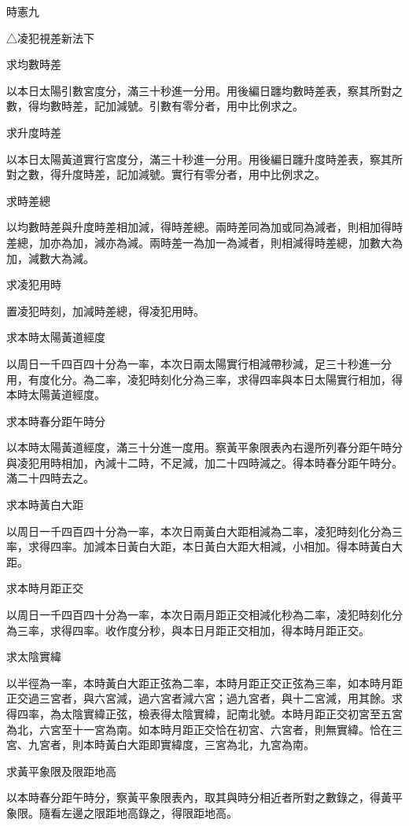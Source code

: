 
\begin{pinyinscope}
時憲九

△凌犯視差新法下

求均數時差

以本日太陽引數宮度分，滿三十秒進一分用。用後編日躔均數時差表，察其所對之數，得均數時差，記加減號。引數有零分者，用中比例求之。

求升度時差

以本日太陽黃道實行宮度分，滿三十秒進一分用。用後編日躔升度時差表，察其所對之數，得升度時差，記加減號。實行有零分者，用中比例求之。

求時差總

以均數時差與升度時差相加減，得時差總。兩時差同為加或同為減者，則相加得時差總，加亦為加，減亦為減。兩時差一為加一為減者，則相減得時差總，加數大為加，減數大為減。

求凌犯用時

置凌犯時刻，加減時差總，得凌犯用時。

求本時太陽黃道經度

以周日一千四百四十分為一率，本次日兩太陽實行相減帶秒減，足三十秒進一分用，有度化分。為二率，凌犯時刻化分為三率，求得四率與本日太陽實行相加，得本時太陽黃道經度。

求本時春分距午時分

以本時太陽黃道經度，滿三十分進一度用。察黃平象限表內右邊所列春分距午時分與凌犯用時相加，內減十二時，不足減，加二十四時減之。得本時春分距午時分。滿二十四時去之。

求本時黃白大距

以周日一千四百四十分為一率，本次日兩黃白大距相減為二率，凌犯時刻化分為三率，求得四率。加減本日黃白大距，本日黃白大距大相減，小相加。得本時黃白大距。

求本時月距正交

以周日一千四百四十分為一率，本次日兩月距正交相減化秒為二率，凌犯時刻化分為三率，求得四率。收作度分秒，與本日月距正交相加，得本時月距正交。

求太陰實緯

以半徑為一率，本時黃白大距正弦為二率，本時月距正交正弦為三率，如本時月距正交過三宮者，與六宮減，過六宮者減六宮；過九宮者，與十二宮減，用其餘。求得四率，為太陰實緯正弦，檢表得太陰實緯，記南北號。本時月距正交初宮至五宮為北，六宮至十一宮為南。如本時月距正交恰在初宮、六宮者，則無實緯。恰在三宮、九宮者，則本時黃白大距即實緯度，三宮為北，九宮為南。

求黃平象限及限距地高

以本時春分距午時分，察黃平象限表內，取其與時分相近者所對之數錄之，得黃平象限。隨看左邊之限距地高錄之，得限距地高。


\end{pinyinscope}
